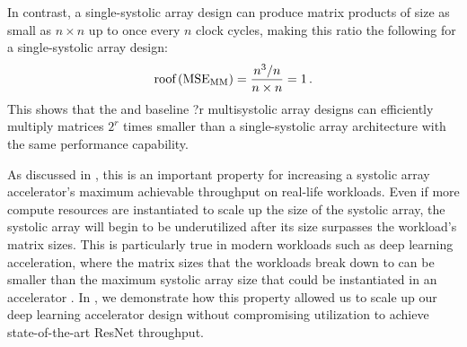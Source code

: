 In contrast, a single-systolic array design can produce matrix products of size as small as $n\times n$ up to once every $n$ clock cycles, making this ratio the following for a single-systolic array design:
\begin{align}
  \text{roof}\left(\text{MSE}_{\text{MM}}\right)
  = \frac {n^3/ n} {n\times n} = 1
  \,.
\end{align}
This shows that the \smmArch and baseline \mm?r multisystolic array designs can efficiently multiply matrices $2^r$ times smaller than a single-systolic array architecture with the same performance capability.

As discussed in , this is an important property for increasing a systolic array accelerator's maximum achievable throughput on real-life workloads.
Even if more compute resources are instantiated to scale up the size of the systolic array, the systolic array will begin to be underutilized after its size surpasses the workload's matrix sizes.
This is particularly true in modern workloads such as deep learning acceleration, where the matrix sizes that the workloads break down to can be smaller than the maximum systolic array size that could be instantiated in an accelerator \citeMultiSys.
In , we demonstrate how this property allowed us to scale up our deep learning accelerator design without compromising utilization to achieve state-of-the-art ResNet \cite{kaiming2016deep} throughput.
